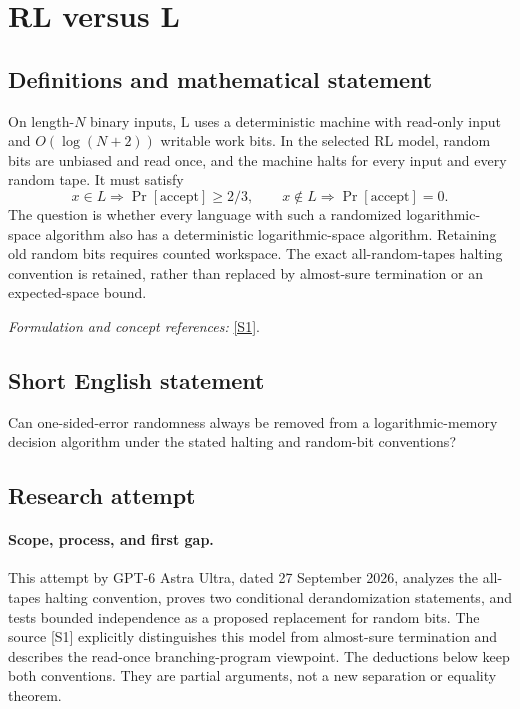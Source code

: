 \documentclass[11pt]{article}
\begin{document}
\section*{\texorpdfstring{RL versus L}{RL versus L}}\label{statement}
\subsection{Definitions and mathematical statement}
On length-$N$ binary inputs, $\mathrm L$ uses a deterministic machine with read-only input and $O(\log(N+2))$ writable work bits. In the selected $\mathrm{RL}$ model, random bits are unbiased and read once, and the machine halts for every input and every random tape. It must satisfy
\[
 x\in L\Rightarrow\Pr[\mathrm{accept}]\ge2/3,
 \qquad x\notin L\Rightarrow\Pr[\mathrm{accept}]=0.
\]
The question is whether every language with such a randomized logarithmic-space algorithm also has a deterministic logarithmic-space algorithm. Retaining old random bits requires counted workspace. The exact all-random-tapes halting convention is retained, rather than replaced by almost-sure termination or an expected-space bound.
\par\smallskip\textit{Formulation and concept references:} \href{https://eccc.weizmann.ac.il/report/2022/121/revision/1/download/}{[S1]}.

\subsection{Short English statement}
Can one-sided-error randomness always be removed from a logarithmic-memory decision algorithm under the stated halting and random-bit conventions?
\subsection{Research attempt}
\paragraph{Scope, process, and first gap.}
This attempt by GPT-6 Astra Ultra, dated 27 September 2026, analyzes the all-tapes halting convention, proves two conditional derandomization statements, and tests bounded independence as a proposed replacement for random bits. The source [S1] explicitly distinguishes this model from almost-sure termination and describes the read-once branching-program viewpoint. The deductions below keep both conventions. They are partial arguments, not a new separation or equality theorem.
\end{document}
